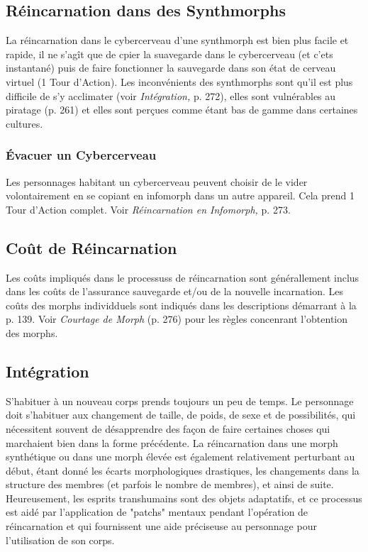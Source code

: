 \subsection{Réincarnation dans des Synthmorphs} 

La réincarnation dans le cybercerveau d'une synthmorph est bien plus facile et rapide, il ne s'agît que de cpier la suavegarde dans le cybercerveau (et c'ets instantané) puis de faire fonctionner la sauvegarde dans son état de cerveau virtuel (1 Tour d'Action). Les inconvénients des synthmorphs sont qu'il est plus difficile de s'y acclimater (voir \textit{Intégration, } p. 272), elles sont vulnérables au piratage (p. 261) et elles sont perçues comme étant bas de gamme dans certaines cultures. 

\subsubsection{Évacuer un Cybercerveau} 

Les personnages habitant un cybercerveau peuvent choisir de le vider volontairement en se copiant en infomorph dans un autre appareil. Cela prend 1 Tour d'Action complet. Voir \textit{Réincarnation en Infomorph,} p. 273. 

\subsection{Coût de Réincarnation} 

Les coûts impliqués dans le processuss de réincarnation sont générallement inclus dans les coûts de l'assurance sauvegarde et/ou de la nouvelle incarnation. Les coûts des morphs individduels sont indiqués dans les descriptions démarrant à la p. 139. Voir \textit{Courtage de Morph} (p. 276) pour les règles concenrant l'obtention des morphs. 

\subsection{Intégration} 

S'habituer à un nouveau corps prends toujours un peu de temps. Le personnage doit s'habituer aux changement de taille, de poids, de sexe et de possibilités, qui nécessitent souvent de désapprendre des façon de faire certaines choses qui marchaient bien dans la forme précédente. La réincarnation dans une morph synthétique ou dans une morph élevée est également relativement perturbant au début, étant donné les écarts morphologiques drastiques, les changements dans la structure des membres (et parfois le nombre de membres), et ainsi de suite. Heureusement, les esprits transhumains sont des objets adaptatifs, et ce processus est aidé par l'application de "patchs" mentaux pendant l'opération de réincarnation et qui fournissent une aide préciseuse au personnage pour l'utilisation de son corps. 

